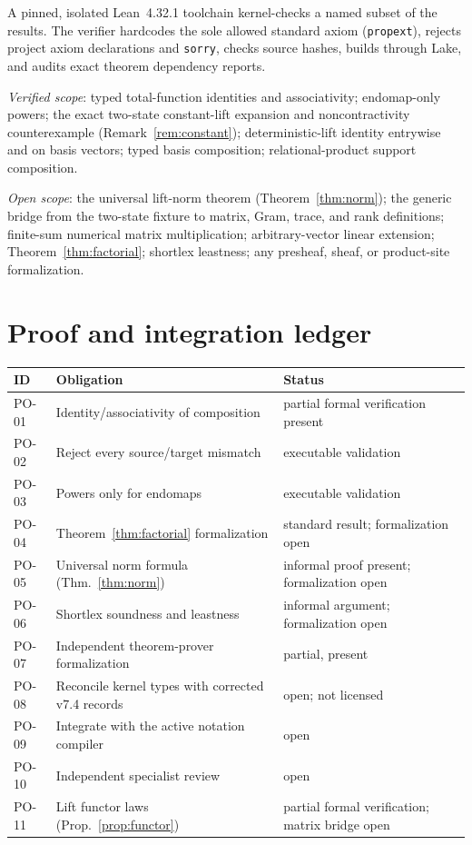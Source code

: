 \documentclass[11pt]{amsart}
\theoremstyle{definition}
\theoremstyle{remark}
\begin{document}
A pinned, isolated Lean~4.32.1 toolchain kernel-checks a named subset of the results. The verifier hardcodes the sole allowed standard axiom (\texttt{propext}), rejects project axiom declarations and \texttt{sorry}, checks source hashes, builds through Lake, and audits exact theorem dependency reports.

\emph{Verified scope}: typed total-function identities and associativity; endomap-only powers; the exact two-state constant-lift expansion and noncontractivity counterexample (Remark~\ref{rem:constant}); deterministic-lift identity entrywise and on basis vectors; typed basis composition; relational-product support composition.

\emph{Open scope}: the universal lift-norm theorem (Theorem~\ref{thm:norm}); the generic bridge from the two-state fixture to matrix, Gram, trace, and rank definitions; finite-sum numerical matrix multiplication; arbitrary-vector linear extension; Theorem~\ref{thm:factorial}; shortlex leastness; any presheaf, sheaf, or product-site formalization.

\section{Proof and integration ledger}

\begin{center}
\small
\begin{tabular}{@{}llp{5.2cm}@{}}
\toprule
ID & Obligation & Status \\
\midrule
PO-01 & Identity/associativity of composition & partial formal verification present \\
PO-02 & Reject every source/target mismatch & executable validation \\
PO-03 & Powers only for endomaps & executable validation \\
PO-04 & Theorem~\ref{thm:factorial} formalization & standard result; formalization open \\
PO-05 & Universal norm formula (Thm.~\ref{thm:norm}) & informal proof present; formalization open \\
PO-06 & Shortlex soundness and leastness & informal argument; formalization open \\
PO-07 & Independent theorem-prover formalization & partial, present \\
PO-08 & Reconcile kernel types with corrected v7.4 records & open; not licensed \\
PO-09 & Integrate with the active notation compiler & open \\
PO-10 & Independent specialist review & open \\
PO-11 & Lift functor laws (Prop.~\ref{prop:functor}) & partial formal verification; matrix bridge open \\
\bottomrule
\end{tabular}
\end{center}
\end{document}
